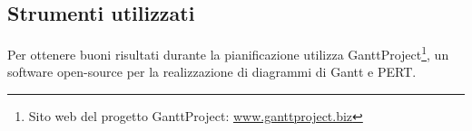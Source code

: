    \subsection{Strumenti utilizzati}
   Per ottenere buoni risultati durante la pianificazione \nomeAzienda{} utilizza GanttProject\footnote{Sito web del progetto GanttProject: \href{http://www.ganttproject.biz/}{www.ganttproject.biz}}, un software open-source per la realizzazione di diagrammi di \gls{Gantt} e \gls{PERT}.